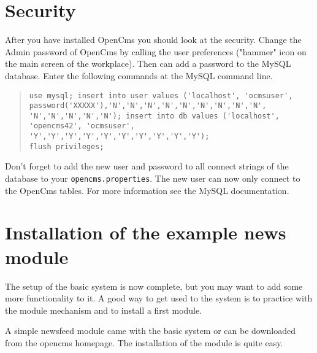 \section{Security}
After you have installed OpenCms you should look at the security.
Change the Admin password of OpenCms by calling the user
preferences ("hammer" icon on the main screen of the workplace).
Then can add a password to the MySQL database. Enter the following
commands
at the MySQL command line.\\

\begin{quote}
\begin{verbatim}
use mysql; insert into user values ('localhost', 'ocmsuser',
password('XXXXX'),'N','N','N','N','N','N','N','N','N',
'N','N','N','N','N'); insert into db values ('localhost',
'opencms42', 'ocmsuser', 'Y','Y','Y','Y','Y','Y','Y','Y','Y','Y');
flush privileges;
\end{verbatim}
\end{quote}

Don't forget to add the new user and password to all connect
strings of the database to your \texttt{opencms.properties}. The
new user can now only connect to the OpenCms tables. For more
information see the MySQL documentation.

\section{Installation of the example news module}

The setup of the basic system is now complete, but you may want to
add some more functionality to it. A good way to get used to the
system is to practice with the module mechanism and to install a
first module.

A simple newsfeed module came with the basic system or can be
downloaded from the opencms homepage. The installation of the
module is quite easy.

